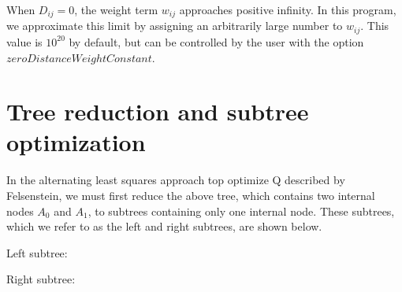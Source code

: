 \documentclass{article} %
\begin{document}
When $D_{ij} = 0$, the weight term $w_{ij}$ approaches positive infinity. In this program, we approximate this limit by assigning an arbitrarily large number to $w_{ij}$. This value is $10^{20}$ by default, but can be controlled by the user with the option $zeroDistanceWeightConstant$.

\section{Tree reduction and subtree optimization}
In the alternating least squares approach top optimize Q described by Felsenstein, we must first reduce the above tree, which contains two internal nodes $A_0$ and $A_1$, to subtrees containing only one internal node. These subtrees, which we refer to as the left and right subtrees, are shown below.

Left subtree:
\begin{center}
\end{center}

Right subtree:
\begin{center}
\end{center}
\end{document}
